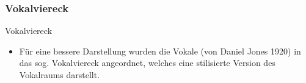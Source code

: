 %
\subsubsection{Vokalviereck}

\begin{frame}{Vokalviereck}

	\begin{itemize}
		\item Für eine bessere Darstellung wurden die Vokale (von Daniel Jones 1920) in das sog. Vokalviereck angeordnet, welches eine stilisierte Version des Vokalraums darstellt.
	\end{itemize}


\end{frame}
